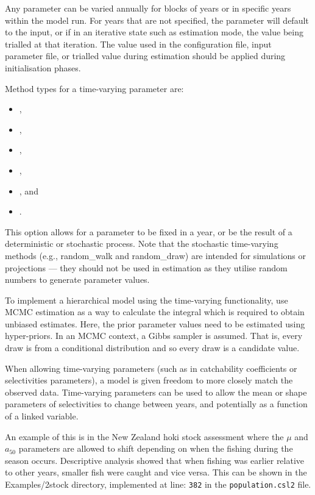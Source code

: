Any parameter can be varied annually for blocks of years or in specific years within the model run. For years that are not specified, the parameter will default to the input, or if in an iterative state such as estimation mode, the value being trialled at that iteration. The value used in the configuration file, input parameter file, or trialled value during estimation should be applied during initialisation phases.

Method types for a time-varying parameter are:

\begin{itemize}
\item {},
\item {},
\item {},
\item {},
\item {}, and
\item {}.
\end{itemize}

This option allows for a parameter to be fixed in a year, or be the result of a deterministic or stochastic process. Note that the stochastic time-varying methods (e.g., random\_walk and random\_draw) are intended for simulations or projections --- they should not be used in estimation as they utilise random numbers to generate parameter values. 

To implement a hierarchical model using the time-varying functionality, use MCMC estimation as a way to calculate the integral which is required to obtain unbiased estimates. Here, the prior parameter values need to be estimated using hyper-priors. In an MCMC context, a Gibbs sampler is assumed. That is, every draw is from a conditional distribution and so every draw is a candidate value.

When allowing time-varying parameters (such as in catchability coefficients or selectivities parameters), a model is given freedom to more closely match the observed data. Time-varying parameters can be used to allow the mean or shape parameters of selectivities to change between years, and potentially as a function of a linked variable.

An example of this is in the New Zealand hoki stock assessment where the $\mu$ and $a_{50}$ parameters are allowed to shift depending on when the fishing during the season occurs. Descriptive analysis showed that when fishing was earlier relative to other years, smaller fish were caught and vice versa. This can be shown in the Examples/2stock directory, implemented at line: \texttt{382} in the \texttt{population.csl2} file.

